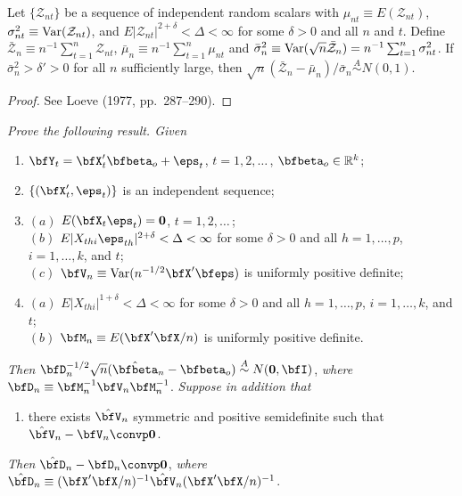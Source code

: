 \begin{theorem}\label{thm:liapounov-array}
Let $\{\mathcal{Z}_{nt}\}$ be a sequence of independent random scalars with $\mu_{nt} \equiv E(\mathcal{Z}_{nt})$, $\sigma_{nt}^2 \equiv \operatorname{Var}(\mathcal{Z}_{nt})$, and $E|\mathcal{Z}_{nt}|^{2+\delta} < \Delta < \infty$ for some $\delta > 0$ and all $n$ and $t$. Define $\bar{\mathcal{Z}}_n \equiv n^{-1}\sum_{t=1}^{n}\mathcal{Z}_{nt}$, $\bar{\mu}_n \equiv n^{-1}\sum_{t=1}^{n}\mu_{nt}$ and $\bar{\sigma}_n^2 \equiv \operatorname{Var}(\sqrt{n}\bar{\mathcal{Z}}_n) = n^{-1}\sum_{t=1}^{n}\sigma_{nt}^2$. If $\bar{\sigma}_n^2 > \delta' > 0$ for all $n$ sufficiently large, then $\sqrt{n}(\bar{\mathcal{Z}}_n - \bar{\mu}_n)/\bar{\sigma}_n \overset{A}{\sim} N(0,1)$.
\end{theorem}

\begin{proof}
See Loeve (1977, pp.~287--290).
\end{proof}

\begin{exercises}

\item\label{ex:ols-ihd-clt} \textit{Prove the following result. Given}
\begin{enumerate}
\item[$(i)$] $\bfY_t = \bfX_t'\bfbeta_o + \eps_t$, \quad $t = 1, 2, \ldots$\,, $\bfbeta_o \in \mathbb{R}^k$;
\item[$(ii)$] $\{(\bfX_t', \eps_t)\}$ is an independent sequence;
\item[$(iii)$] $(a)$ $E(\bfX_t \eps_t) = \mathbf{0}$, \quad $t = 1, 2, \ldots$\,;\\
$(b)$ $E|X_{thi}\eps_{th}|^{2+\delta} < \Delta < \infty$ for some $\delta > 0$ and all $h = 1, \ldots, p$, $i = 1, \ldots, k$, and $t$;\\
$(c)$ $\bfV_n \equiv \Var(n^{-1/2}\bfX'\bfeps)$ is uniformly positive definite;
\item[$(iv)$] $(a)$ $E|X_{thi}|^{1+\delta} < \Delta < \infty$ for some $\delta > 0$ and all $h = 1, \ldots, p$, $i = 1, \ldots, k$, and $t$;\\
$(b)$ $\bfM_n \equiv E(\bfX'\bfX/n)$ is uniformly positive definite.
\end{enumerate}

\textit{Then} $\bfD_n^{-1/2}\sqrt{n}(\hat{\bfbeta}_n - \bfbeta_o) \overset{A}{\sim} N(\mathbf{0}, \bfI)$, \textit{where} $\bfD_n \equiv \bfM_n^{-1}\bfV_n\bfM_n^{-1}$. \textit{Suppose in addition that}

\begin{enumerate}
\item[$(v)$] there exists $\hat{\bfV}_n$ symmetric and positive semidefinite such that $\hat{\bfV}_n - \bfV_n \convp \mathbf{0}$.
\end{enumerate}

\textit{Then} $\hat{\bfD}_n - \bfD_n \convp \mathbf{0}$, \textit{where} $\hat{\bfD}_n \equiv (\bfX'\bfX/n)^{-1}\hat{\bfV}_n(\bfX'\bfX/n)^{-1}$.

\end{exercises}

